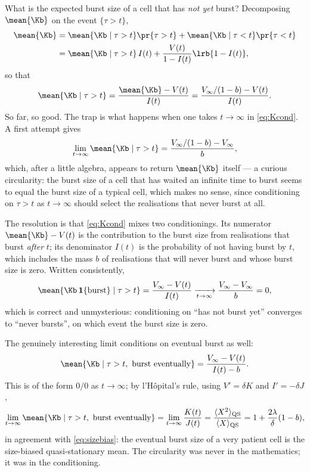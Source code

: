 What is the expected burst size of a cell that has \emph{not yet} burst?
Decomposing $\mean{\Kb}$ on the event $\{\tau>t\}$,
\begin{align}
\mean{\Kb} &= \mean{\Kb\mid \tau > t} \pr{\tau > t} + \mean{\Kb\mid \tau < t}\pr{\tau<t}\nonumber\\
&= \mean{\Kb\mid\tau > t}\, I(t) + \frac{V(t)}{1 - I(t)} \lrb{1 - I(t)},
\end{align}
so that
\begin{equation}
\mean{\Kb\mid \tau > t}  = \frac{\mean{\Kb} - V(t)}{I(t)}
=\frac{V_\infty/(1-b) - V(t)}{I(t)}.
\label{eq:Kcond}
\end{equation}
So far, so good. The trap is what happens when one takes $t\to\infty$ in
\eqref{eq:Kcond}. A first attempt gives
$$
\lim_{t\to\infty}\mean{\Kb\mid \tau > t}
=\frac{V_\infty/(1-b)-V_\infty}{b},
$$
which, after a little algebra, appears to return $\mean{\Kb}$ itself --- a
curious circularity: the burst size of a cell that has waited an infinite
time to burst seems to equal the burst size of a typical cell, which makes
no sense, since conditioning on $\tau>t$ as $t\to\infty$ should select the
realisations that never burst at all.

The resolution is that \eqref{eq:Kcond} mixes two conditionings. Its
numerator $\mean{\Kb}-V(t)$ is the contribution to the burst size from
realisations that burst \emph{after} $t$; its denominator $I(t)$ is the
probability of not having burst by $t$, which includes the mass $b$ of
realisations that will never burst and whose burst size is zero. Written
consistently,
\begin{equation}
\mean{\Kb\,\mathbf 1\{\text{burst}\}\mid\tau>t}
=\frac{V_\infty-V(t)}{I(t)}
\xrightarrow[t\to\infty]{}\frac{V_\infty-V_\infty}{b}=0,
\end{equation}
which is correct and unmysterious: conditioning on ``has not burst yet''
converges to ``never bursts'', on which event the burst size is zero.

The genuinely interesting limit conditions on eventual burst as well:
\begin{equation}
\mean{\Kb\mid \tau>t,\ \text{burst eventually}}
=\frac{V_\infty-V(t)}{I(t)-b}.
\end{equation}
This is of the form $0/0$ as $t\to\infty$; by l'H\^opital's rule, using
$V'=\delta K$ and $I'=-\delta J$,
\begin{equation}
\lim_{t\to\infty}\mean{\Kb\mid \tau>t,\ \text{burst eventually}}
=\lim_{t\to\infty}\frac{K(t)}{J(t)}
=\frac{\langle X^2\rangle_{\rm QS}}{\langle X\rangle_{\rm QS}}
=1+\frac{2\lambda}{\delta}(1-b),
\label{eq:latemean}
\end{equation}
in agreement with \eqref{eq:sizebias}: the eventual burst size of a very
patient cell is the size-biased quasi-stationary mean. The circularity was
never in the mathematics; it was in the conditioning.

